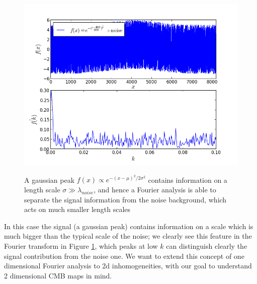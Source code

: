 \documentclass[11pt, a4paper,oneside,openright]{book}
\numberwithin{equation}{section}
\begin{document}
\begin{figure}
\begin{center}
\includegraphics[scale=0.6]{Fourier/gauss+noise.png}
\label{}
\end{center}
\caption{A gaussian peak $f(x)\propto e^{-(x-\mu)^2/2\sigma^2}$ contains information on a length scale $\sigma \gg \lambda_{noise}$, and hence a Fourier analysis is able to separate the signal information from the noise background, which acts on much smaller length scales }
\label{gaussnoise}
\end{figure}
In this case the signal (a gaussian peak) contains information on a scale which is much bigger than the typical scale of the noise; we clearly see this feature in the Fourier transform in Figure \ref{gaussnoise}, which peaks at low $k$ can distinguish clearly the signal contribution from the noise one. We want to extend this concept of one dimensional Fourier analysis to 2d inhomogeneities, with our goal to understand 2 dimensional CMB maps in mind. 
\end{document}
